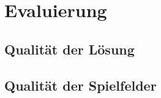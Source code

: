 \chapter{Evaluierung}
\label{ch:S6_Evaluierung}

\section{Qualität der Lösung}
\label{ch:CH6_qualtiy_of_solution}

\section{Qualität der Spielfelder}
\label{ch:CH6_qualtiy_of_gameboards}


